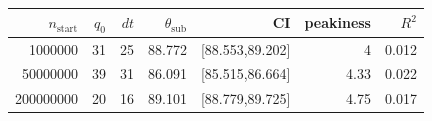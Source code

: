 \begin{tabular}{r r r r r r r}
\hline
$n_{\mathrm{start}}$ & $q_0$ & $dt$ & $\theta_{\mathrm{sub}}$ & CI & peakiness & $R^2$ \\
\hline
1000000 & 31 & 25 & 88.772 & [88.553,89.202] & 4 & 0.012 \\
50000000 & 39 & 31 & 86.091 & [85.515,86.664] & 4.33 & 0.022 \\
200000000 & 20 & 16 & 89.101 & [88.779,89.725] & 4.75 & 0.017 \\
\hline
\end{tabular}
